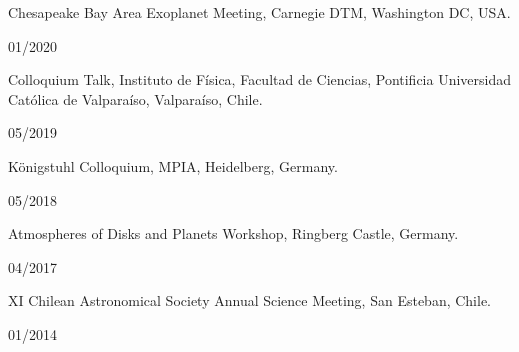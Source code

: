 \documentclass[12pt, a4paper]{article} %
\begin{document}
\begin{minipage}[t]{0.7\textwidth}
\begin{flushleft}%
  \setlength{\leftskip}{0.2cm}%
Chesapeake Bay Area Exoplanet Meeting, Carnegie DTM, Washington DC, USA.
\end{flushleft}
\end{minipage}
\begin{minipage}[t]{0.3\textwidth}
\hfill 01/2020
\end{minipage}
\vspace{0.2cm}

\begin{minipage}[t]{0.7\textwidth}
\begin{flushleft}%
  \setlength{\leftskip}{0.2cm}%
Colloquium Talk, Instituto de F\'isica, Facultad de Ciencias, Pontificia Universidad Cat\'olica de Valpara\'iso, Valpara\'iso, Chile.
\end{flushleft}
\end{minipage}
\begin{minipage}[t]{0.3\textwidth}
\hfill 05/2019
\end{minipage}
\vspace{0.2cm}

\begin{minipage}[t]{0.7\textwidth}
\begin{flushleft}%
  \setlength{\leftskip}{0.2cm}%
Königstuhl Colloquium, MPIA, Heidelberg, Germany.
\end{flushleft}
\end{minipage}
\begin{minipage}[t]{0.3\textwidth}
\hfill 05/2018
\end{minipage}
\vspace{0.2cm}

\begin{minipage}[t]{0.7\textwidth}
\begin{flushleft}%
  \setlength{\leftskip}{0.2cm}%
Atmospheres of Disks and Planets Workshop, Ringberg Castle, Germany.
\end{flushleft}
\end{minipage}
\begin{minipage}[t]{0.3\textwidth}
\hfill 04/2017
\end{minipage}
\vspace{0.2cm}

\begin{minipage}[t]{0.7\textwidth}
\begin{flushleft}%
  \setlength{\leftskip}{0.2cm}%
XI Chilean Astronomical Society Annual Science Meeting, San Esteban, Chile.
\end{flushleft}
\end{minipage}
\begin{minipage}[t]{0.3\textwidth}
\hfill 01/2014
\end{minipage}
\vspace{0.2cm}
\end{document}
